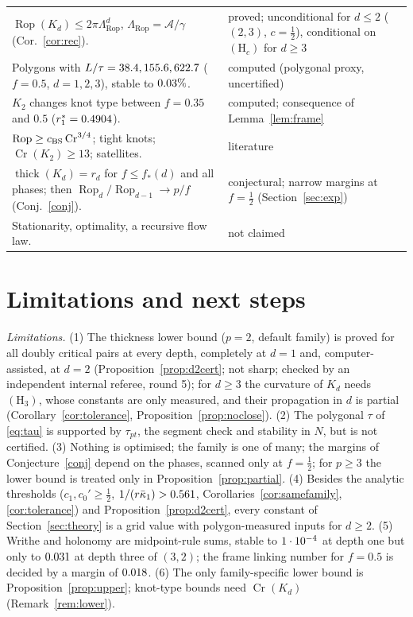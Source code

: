 \documentclass[10pt,a4paper]{article}
\theoremstyle{plain}
\theoremstyle{definition}
\theoremstyle{remark}
\newcommand{\thick}{\operatorname{thick}}
\newcommand{\Rop}{\operatorname{Rop}}
\newcommand{\Cr}{\operatorname{Cr}}
\begin{document}
{\begin{longtable}{@{}p{}p{}@{}}
$\Rop(K_d)\le2\pi\Lambda_{\Rop}^d$, $\Lambda_{\Rop}=\mathcal A/\gamma$ (Cor.~\ref{cor:rec}). & proved; unconditional for $d\le2$ ($(2,3)$, $c=\frac12$), conditional on $(\mathrm H_c)$ for $d\ge3$\\
Polygons with $L/\tau=38.4,155.6,622.7$ ($f=0.5$, $d=1,2,3$), stable to $0.03\%$. & computed (polygonal proxy, uncertified)\\
$K_2$ changes knot type between $f=0.35$ and $0.5$ ($r_1^\ast=0.4904$). & computed; consequence of Lemma~\ref{lem:frame}\\
$\Rop\ge c_{\rm BS}\Cr^{3/4}$; tight knots; $\Cr(K_2)\ge13$; satellites. & literature \cite{BuckSimon1999,CKS2002,KalfagianniMcConkey2024,Lackenby2014}\\
$\thick(K_d)=r_d$ for $f\le f_\ast(d)$ and all phases; then $\Rop_d/\Rop_{d-1}\to p/f$ (Conj.~\ref{conj}). & conjectural; narrow margins at $f=\frac12$ (Section~\ref{sec:exp})\\
Stationarity, optimality, a recursive flow law. & not claimed\\
\bottomrule\end{longtable}}

\section{Limitations and next steps}

\emph{Limitations.} (1) The thickness lower bound ($p=2$, default family) is proved for all doubly critical pairs at every depth, completely at $d=1$ and, computer-assisted, at $d=2$ (Proposition~\ref{prop:d2cert}; not sharp; checked by an independent internal referee, round 5); for $d\ge3$ the curvature of $K_d$ needs $(\mathrm H_3)$, whose constants are only measured, and their propagation in $d$ is partial (Corollary~\ref{cor:tolerance}, Proposition~\ref{prop:noclose}). (2) The polygonal $\tau$ of \eqref{eq:tau} is supported by $\tau_{pt}$, the segment check and stability in $N$, but is not certified. (3) Nothing is optimised; the family is one of many; the margins of Conjecture~\ref{conj} depend on the phases, scanned only at $f=\frac12$; for $p\ge3$ the lower bound is treated only in Proposition~\ref{prop:partial}. (4) Besides the analytic thresholds ($c_1,c_0'\ge\frac12$, $1/(r\bar\kappa_1)>0.561$, Corollaries~\ref{cor:samefamily}, \ref{cor:tolerance}) and Proposition~\ref{prop:d2cert}, every constant of Section~\ref{sec:theory} is a grid value with polygon-measured inputs for $d\ge2$. (5) Writhe and holonomy are midpoint-rule sums, stable to $1\cdot10^{-4}$ at depth one but only to $0.031$ at depth three of $(3,2)$; the frame linking number for $f=0.5$ is decided by a margin of $0.018$. (6) The only family-specific lower bound is Proposition~\ref{prop:upper}; knot-type bounds need $\Cr(K_d)$ (Remark~\ref{rem:lower}).
\end{document}
